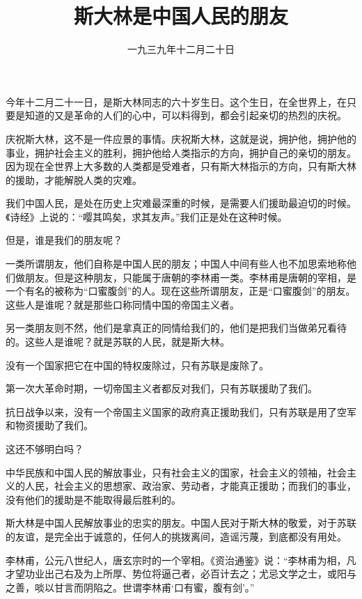 
\title{斯大林是中国人民的朋友}
\date{一九三九年十二月二十日}
\maketitle


今年十二月二十一日，是斯大林同志的六十岁生日。这个生日，在全世界上，在只要是知道的又是革命的人们的心中，可以料得到，都会引起亲切的热烈的庆祝。

庆祝斯大林，这不是一件应景的事情。庆祝斯大林，这就是说，拥护他，拥护他的事业，拥护社会主义的胜利，拥护他给人类指示的方向，拥护自己的亲切的朋友。因为现在全世界上大多数的人类都是受难者，只有斯大林指示的方向，只有斯大林的援助，才能解脱人类的灾难。

我们中国人民，是处在历史上灾难最深重的时候，是需要人们援助最迫切的时候。《诗经》上说的：“嘤其鸣矣，求其友声。”我们正是处在这种时候。

但是，谁是我们的朋友呢？

一类所谓朋友，他们自称是中国人民的朋友；中国人中间有些人也不加思索地称他们做朋友。但是这种朋友，只能属于唐朝的李林甫一类。李林甫是唐朝的宰相，是一个有名的被称为“口蜜腹剑”的人。现在这些所谓朋友，正是“口蜜腹剑”的朋友。这些人是谁呢？就是那些口称同情中国的帝国主义者。

另一类朋友则不然，他们是拿真正的同情给我们的，他们是把我们当做弟兄看待的。这些人是谁呢？就是苏联的人民，就是斯大林。

没有一个国家把它在中国的特权废除过，只有苏联是废除了。

第一次大革命时期，一切帝国主义者都反对我们，只有苏联援助了我们。

抗日战争以来，没有一个帝国主义国家的政府真正援助我们，只有苏联是用了空军和物资援助了我们。

这还不够明白吗？

中华民族和中国人民的解放事业，只有社会主义的国家，社会主义的领袖，社会主义的人民，社会主义的思想家、政治家、劳动者，才能真正援助；而我们的事业，没有他们的援助是不能取得最后胜利的。

斯大林是中国人民解放事业的忠实的朋友。中国人民对于斯大林的敬爱，对于苏联的友谊，是完全出于诚意的，任何人的挑拨离间，造谣污蔑，到底都没有用处。


\begin{maonote}
李林甫，公元八世纪人，唐玄宗时的一个宰相。《资治通鉴》说：“李林甫为相，凡才望功业出己右及为上所厚、势位将逼己者，必百计去之；尤忌文学之士，或阳与之善，啖以甘言而阴陷之。世谓李林甫‘口有蜜，腹有剑’。”
\end{maonote}
